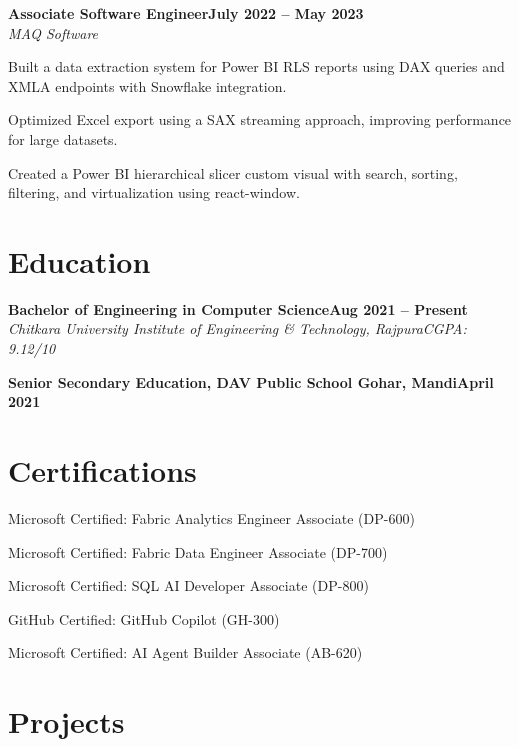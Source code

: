 \documentclass[a4paper,10pt]{article}
\newcommand{\entry}[4]{%
  \noindent\textbf{#1}\hfill\textbf{#2}\\
  \textit{\color{muted}#3}\hfill\textit{\color{muted}#4}%
}
\newcommand{\entrynoloc}[2]{%
  \noindent\textbf{#1}\hfill\textbf{#2}%
}
\begin{document}
\vspace{5pt}
\entry{Associate Software Engineer}{July 2022 -- May 2023}{MAQ Software}{}

\vspace{2pt}
\begin{tight}
  \item Built a data extraction system for Power BI RLS reports using DAX queries and XMLA endpoints with Snowflake integration.
  \item Optimized Excel export using a SAX streaming approach, improving performance for large datasets.
  \item Created a Power BI hierarchical slicer custom visual with search, sorting, filtering, and virtualization using react-window.
\end{tight}

\section{Education}
\entry{Bachelor of Engineering in Computer Science}{Aug 2021 -- Present}{Chitkara University Institute of Engineering \& Technology, Rajpura}{CGPA: 9.12/10}

\vspace{5pt}
\entrynoloc{Senior Secondary Education, DAV Public School Gohar, Mandi}{April 2021}

\section{Certifications}
\begin{tight}
  \item Microsoft Certified: Fabric Analytics Engineer Associate (DP-600)
  \item Microsoft Certified: Fabric Data Engineer Associate (DP-700)
  \item Microsoft Certified: SQL AI Developer Associate (DP-800)
  \item GitHub Certified: GitHub Copilot (GH-300)
  \item Microsoft Certified: AI Agent Builder Associate (AB-620)
\end{tight}

\section{Projects}
\end{document}
